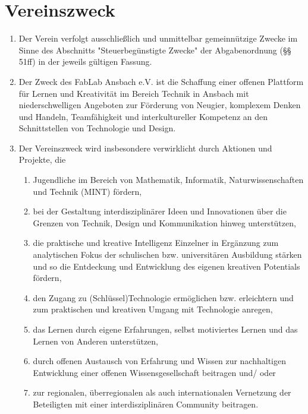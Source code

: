 \section{Vereinszweck}
\begin{enumerate}
  \item Der Verein verfolgt ausschließlich und unmittelbar gemeinnützige Zwecke im Sinne des Abschnitts "Steuerbegünstigte Zwecke" der Abgabenordnung (§§ 51ff) in der jeweils gültigen Fassung.
  \item Der Zweck des FabLab Ansbach e.V. ist die Schaffung einer offenen Plattform für Lernen und Kreativität im Bereich Technik in Ansbach mit niederschwelligen Angeboten zur Förderung von Neugier, komplexem Denken und Handeln, Teamfähigkeit und interkultureller Kompetenz an den Schnittstellen von Technologie und Design.
  \item Der Vereinszweck wird insbesondere verwirklicht durch Aktionen und Projekte, die
    \begin{enumerate}[label={(\alph*)}]
      \item Jugendliche im Bereich von Mathematik, Informatik, Naturwissenschaften und Technik (MINT) fördern,
      \item bei der Gestaltung interdisziplinärer Ideen und Innovationen über die Grenzen von Technik, Design und Kommunikation hinweg unterstützen,
      \item die praktische und kreative Intelligenz Einzelner in Ergänzung zum analytischen Fokus der schulischen bzw. universitären Ausbildung stärken und so die Entdeckung und Entwicklung des eigenen kreativen Potentials fördern,
      \item den Zugang zu (Schlüssel)Technologie ermöglichen bzw. erleichtern und zum praktischen und kreativen Umgang mit Technologie anregen,
      \item das Lernen durch eigene Erfahrungen, selbst motiviertes Lernen und das Lernen von Anderen unterstützen,
      \item durch offenen Austausch von Erfahrung und Wissen zur nachhaltigen Entwicklung einer offenen Wissensgesellschaft beitragen und/ oder
      \item zur regionalen, überregionalen als auch internationalen Vernetzung der Beteiligten mit einer interdisziplinären Community beitragen.
    \end{enumerate}
\end{enumerate}

